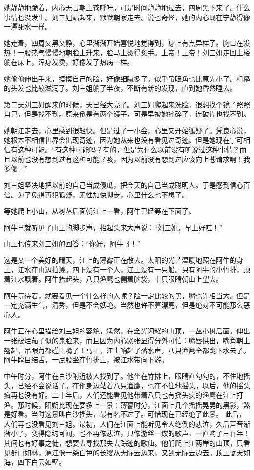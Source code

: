  她静静地跪着，内心无言朝上苍呼吁。可是时间静静地过去，四周黑下来了。什么事情也没发生。刘三姐站起来，默默朝家走去。说也奇怪，她的内心现在宁静得像一潭死水一样。 
 
 她走着，四周又黑又静，心里渐渐开始喜悦地觉得到，身上有点异样了。胸口在发热！一股热气慢慢地朝脸上升来，脸马上烫得炙手。上帝！上帝！刘三姐走回土楼躺在床上，浑身发烫，好像发了热病一样。 
 
 她偷偷伸出手来，摸摸自己的脸，好像细腻多了。似乎吊眼角也比原先小了。粗糙的头发也比较滋润了。刘三姐躺了半夜，不断有新的发现，直到她昏然睡去。 
 
 第二天刘三姐醒来的时候，天已经大亮了。刘三姐爬起来洗脸，很想找个镜子照照自己，但是找不到。原来倒是有两个镜子，可是早被她摔碎了，连破片也找不到。 
 
 她朝江走去，心里感到很轻快。但是过了一小会，心里又开始狐疑了。凭良心说，她根本不相信世界会出现奇迹，因为她从来也没有看见过奇迹。但是她现在宁可相信有这种可能。“有这种可能吗？有的，但是为什么以前没有听说过这种事情？而且以前也没有想到过有这种可能？咳，因为以前没有想到过应该向上苍请求啊！我多傻！” 
 
 刘三姐坚决地把以前的自己当成傻瓜，把今天的自己当成聪明人。于是感到信心百倍。为了免得再犯狐疑，索性加快脚步，心里什么也不想了。 
 
 等她爬上小山，从树丛后面朝江上一看，阿牛已经等在下面了。 
 
 阿牛早就听见了山上的脚步声，抬起头来大声说：“刘三姐，早上好哇！” 
 
 山上也传来刘三姐的回答：“你好，阿牛哥！” 
 
 这是又一个美好的晴天，江上的薄雾正在散去。太阳的光芒温暖地照在阿牛的身上，江水在山边拍溅。四下没有一个人，江上没有一只船。只有阿牛的小竹排，顶着江水飘着。阿牛抬起头，八只渔鹰也侧着脑袋，十只眼睛朝山上望去。 
 
 阿牛等待着，就要看见一个什么样的人呢？脸一定比较的黑，嘴也许相当大。但是一定充满生气，清秀，但是不会妖艳。当然也许不算漂亮，但是绝对不可能那么恶心人。 
 
 阿牛正在心里描绘刘三姐的容貌，猛然，在金光闪耀的山顶，一丛小树后面，伸出一张破烂茄子似的鬼脸来，而且因为内心紧张显得分外可怕：嘴唇拱出，嘴角朝上翘起，吊眼角都碰上嘴了！马上，江上响起了落水声，八只渔鹰全都跳下水去了。阿牛瞠目结舌，一屁股坐在竹排上，被江水带向下游。 
 
 中午时分，阿牛在白沙附近被人找到了。他坐在竹排上，眼睛直勾勾的，不住地摇头，已经不会说话了。在他身边站着八只渔鹰，也在不住地摇头。以后，他的摇头疯再也没有好。二十年后，人们还能看见他带着八只也有摇头疯的渔鹰在江上打渔。那时候，阳朔比现在要多上一景：薄暮时分，江面上几个摇摇晃晃的黑影，煞是好看。当时这景叫白沙摇头，最有名不过了。可惜现在已经绝了此景。 此后，人们再也没看见刘三姐。最初，人们在江面上能听见令人绝倒的悲泣，久后声音渐渐小了，变得隐约可闻，也不再像悲泣，只像游丝一缕的歌声，一直响了三百年！其间也有好事之徒，想要去寻找那失去踪迹的歌仙。他们爬上江两岸的山顶，只看见群山如林，漓江像一条白色的长缨从无际云边来，又到无际云边去。顶上蓝天如海，四下白云如壁。  

